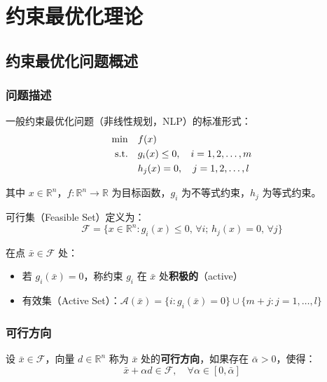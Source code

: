 \chapter{约束最优化理论}\label{chap:constrained-theory}
\section{约束最优化问题概述}\label{sec:ch6-intro}

\subsection{问题描述}

一般约束最优化问题（非线性规划，NLP）的标准形式：
\begin{align}
\min \quad & f(x) \notag \\
\text{s.t.} \quad & g_i(x) \leq 0, \quad i = 1, 2, \ldots, m \label{eq:nlp} \\
& h_j(x) = 0, \quad j = 1, 2, \ldots, l \notag
\end{align}

其中 $x \in \mathbb{R}^n$，$f: \mathbb{R}^n \to \mathbb{R}$ 为目标函数，$g_i$ 为不等式约束，$h_j$ 为等式约束。

\begin{definition}[可行集]
可行集（Feasible Set）定义为：
\[
\mathcal{F} = \{x \in \mathbb{R}^n : g_i(x) \leq 0, \, \forall i; \, h_j(x) = 0, \, \forall j\}
\]
\end{definition}

\begin{definition}[积极约束与有效集]
在点 $\bar{x} \in \mathcal{F}$ 处：
\begin{itemize}
    \item 若 $g_i(\bar{x}) = 0$，称约束 $g_i$ 在 $\bar{x}$ 处\textbf{积极的}（active）
    \item 有效集（Active Set）：$\mathcal{A}(\bar{x}) = \{i : g_i(\bar{x}) = 0\} \cup \{m+j : j=1,\ldots,l\}$
\end{itemize}
\end{definition}

\subsection{可行方向}\label{sec:ch6-feasible-direction}

\begin{definition}[可行方向]
设 $\bar{x} \in \mathcal{F}$，向量 $d \in \mathbb{R}^n$ 称为 $\bar{x}$ 处的\textbf{可行方向}，如果存在 $\bar{\alpha} > 0$，使得：
\[
\bar{x} + \alpha d \in \mathcal{F}, \quad \forall \alpha \in [0, \bar{\alpha}]
\]
\end{definition}

